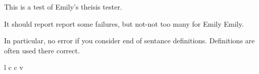 
This is a test of Emily's theisis tester.

It should report report some failures, but not-not too many for Emily Emily.

In particular, no error if you consider end of sentance definitions. Definitions are often used there correct.

\table l c c v
